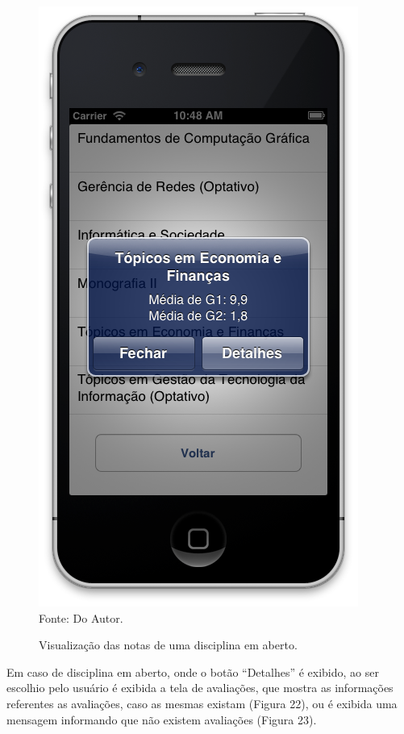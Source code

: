 \begin{figure}[!htb]
     \centering
     \caption[Formulário Notas da Graduação - Visualização de Disciplina Aberta]{Visualização das notas de uma disciplina em aberto.}
     \includegraphics[scale=0.38]{imagens/formvisualizacaomediascomdetalhes.png}
     \\  Fonte: Do Autor.
\end{figure}
\newpage

Em caso de disciplina em aberto, onde o botão ``Detalhes'' é exibido, ao ser escolhio pelo usuário é exibida a tela de avaliações, que mostra as informações referentes as avaliações, caso as mesmas existam (Figura 22), ou é exibida uma mensagem informando que não existem avaliações (Figura 23).

